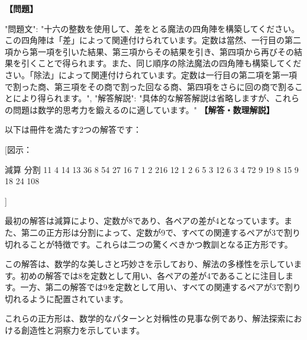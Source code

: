 \documentclass[10pt,a4paper,oneside,openany]{ltjsbook}
\begin{document}
\begin{tcolorbox}[colback=softblue,colframe=primaryblue,title=\textbf{第 407 問：TWO NEW MAGIC SQUARES.},arc=2mm,boxrule=1pt,breakable]
\textbf{【問題】}\par\vspace{0.3em}
{
"問題文": "十六の整数を使用して、差をとる魔法の四角陣を構築してください。この四角陣は「差」によって関連付けられています。定数は當然、一行目の第二項から第一項を引いた結果、第三項からその結果を引き、第四項から再びその結果を引くことで得られます。また、同じ順序の除法魔法の四角陣も構築してください。「除法」によって関連付けられています。定数は一行目の第二項を第一項で割った商、第三項をその商で割った回なる商、第四項をさらに回の商で割ることにより得られます。",
"解答解説": "具体的な解答解説は省略しますが、これらの問題は数学的思考力を鍛えるのに適しています。"
}
\tcblower
\textbf{【解答・数理解説】}\par\vspace{0.3em}
以下は冊件を満たす2つの解答です：

[図示：

    減算         分割
    11 4 14 13   36 8 54 27
    16 7 1 2     216 12 1 2
     6 5 3 12     6 3 4 72
     9 19 8 15    9 18 24 108

]

最初の解答は減算により、定数が8であり、各ペアの差が4となっています。また、第二の正方形は分割によって、定数が9で、すべての関連するペアが3で割り切れることが特徴です。これらは二つの驚くべきかつ教訓となる正方形です。

この解答は、数学的な美しさと巧妙さを示しており、解法の多様性を示しています。初めの解答では8を定数として用い、各ペアの差が4であることに注目します。一方、第二の解答では9を定数として用い、すべての関連するペアが3で割り切れるように配置されています。

これらの正方形は、数学的なパターンと対稱性の見事な例であり、解法探索における創造性と洞察力を示しています。
\end{tcolorbox}
\end{document}
